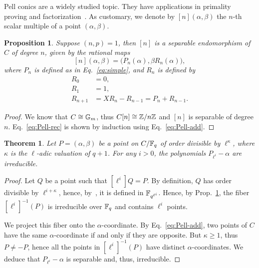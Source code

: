 \documentclass{sig-alternate}
\newtheorem{theorem}[definition]{Theorem}
\newtheorem{proposition}[definition]{Proposition}
\begin{document}
Pell conics are a widely studied topic. They have applications in
primality proving and
factorization~\cite{lemmermeyer03,hambleton12}. As customary, we
denote by $[n](\alpha,\beta)$ the $n$-th scalar multiple of a point
$(\alpha,\beta)$.

\begin{proposition}
  \label{th:T2-divpol}
  Suppose $(n,p)=1$, then $[n]$ is a separable endomorphism of $C$ of
  degree $n$, given by the rational maps
  \begin{equation}
    \label{eq:Pell-rec}
    [n](\alpha,\beta) = \bigr(P_n(\alpha), \beta R_n(\alpha)\bigl),
  \end{equation}
  where $P_n$ is defined as in Eq.~\eqref{eq:simple}, and $R_n$ is
  defined by
  \begin{equation}
    \label{eq:fibonacci}
    \begin{aligned}
      R_0 &= 0,\\
      R_1 &= 1,\\
      R_{n+1} &= XR_{n} - R_{n-1} = P_n + R_{n-1}.
    \end{aligned}
  \end{equation}
\end{proposition}
\begin{proof}
  We know that $C\cong\mathbb{G}_m$, thus $C[n]\cong\mathbb{Z}/n\mathbb{Z}$ and $[n]$
  is separable of degree $n$. Eq.~\eqref{eq:Pell-rec} is shown by
  induction using Eq.~\eqref{eq:Pell-add}.
\end{proof}

\begin{theorem}
  \label{th:T2-irred}
  Let $P=(\alpha,\beta)$ be a point on $C/\mathbb{F}_q$ of order
  divisible by $\ell^\kappa$, where $\kappa$ is the $\ell$-adic
  valuation of $q+1$.  For any $i>0$, the polynomials
  $P_{\ell^i}-\alpha$ are irreducible.
\end{theorem}
\begin{proof}
  Let $Q$ be a point such that $[\ell^i]Q=P$. By definition, $Q$ has
  order divisible by $\ell^{i+\kappa}$, hence,
  by~\cite[Th.~VI.9.1]{lang}, it is defined in
  $\mathbb{F}_{q^{\ell^i}}$. Hence, by Prop.~\ref{th:T2-divpol}, the fiber
  $[\ell^i]^{-1}(P)$ is irreducible over $\mathbb{F}_q$ and contains $\ell^i$
  points.

  We project this fiber onto the $\alpha$-coordinate. By
  Eq.~\eqref{eq:Pell-add}, two points of $C$ have the same
  $\alpha$-coordinate if and only if they are opposite. But
  $\kappa\ge1$, thus $P\ne-P$, hence all the points in
  $[\ell^i]^{-1}(P)$ have distinct $\alpha$-coordinates. We deduce
  that $P_{\ell^i}-\alpha$ is separable and, thus, irreducible.
\end{proof}
\end{document}
